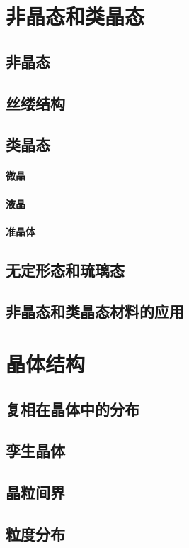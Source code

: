 \documentclass[UTF8]{../NatureUniverse}
\begin{document}
\chapter{非晶态和类晶态}
\section{非晶态}
\section{丝缕结构}
\section{类晶态}
    \subsubsection{微晶}
    \subsubsection{液晶}
    \subsubsection{准晶体}
\section{无定形态和琉璃态}
\section{非晶态和类晶态材料的应用}







\chapter{晶体结构}
\section{复相在晶体中的分布}
\section{孪生晶体}
\section{晶粒间界}
\section{粒度分布}
\end{document}
